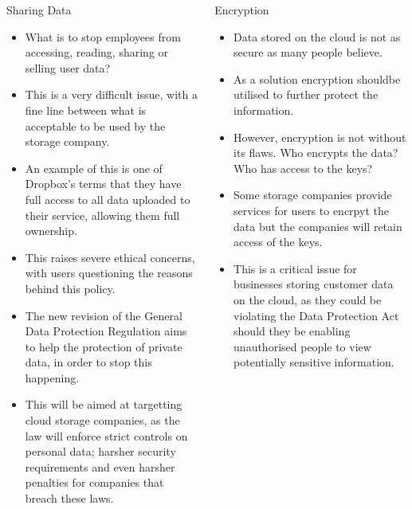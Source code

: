 \documentclass[final]{beamer}
\newlength{\onecolwid}
\newlength{\twocolwid}
\begin{document}
\begin{frame}[t]
\begin{columns}[t]
\begin{column}{\twocolwid}
\begin{columns}[t,totalwidth=\twocolwid]
\begin{column}{\onecolwid}
\begin{block}{Sharing Data}
\begin{itemize}
\item What is to stop employees from accessing, reading, sharing or selling user data?
\item This is a very difficult issue, with a fine line between what is acceptable to be used by the storage company.
\item An example of this is one of Dropbox's terms that they have full access to all data uploaded to their service, allowing them full ownership.
\item This raises severe ethical concerns, with users questioning the reasons behind this policy.
\item The new revision of the General Data Protection Regulation aims to help the protection of private data, in order to stop this happening. 
\item This will be aimed at targetting cloud storage companies, as the law will enforce strict controls on personal data; harsher security requirements and even harsher penalties for companies that breach these laws. 
\end{itemize}
\end{block}


\end{column} %

\begin{column}{\onecolwid}\vspace{-.6in} %


\begin{block}{Encryption}
\begin{itemize}
\item Data stored on the cloud is not as secure as many people believe.
\item As a solution encryption shouldbe utilised to further protect the information.
\item However, encryption is not without its flaws. Who encrypts the data? Who has access to the keys?
\item Some storage companies provide services for users to encrpyt the data but the companies will retain access of the keys\cite{good}.
\item This is a critical issue for businesses storing customer data on the cloud, as they could be violating the Data Protection Act should they be enabling unauthorised people to view potentially sensitive information.
\end{itemize}
\end{block}


\end{column}
\end{columns}
\end{column}
\end{columns}
\end{frame}
\end{document}
